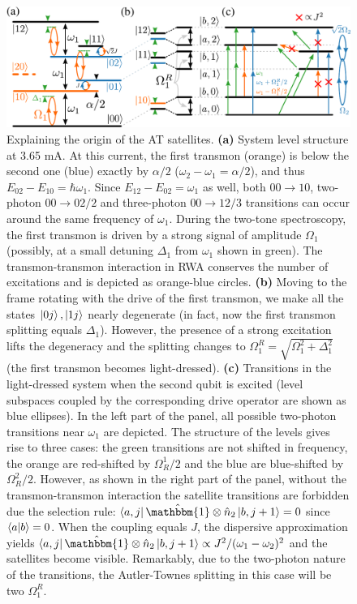 \documentclass[%
 aip,
 amsmath,amssymb,
 reprint,%
]{revtex4-1}
\begin{document}
\begin{figure}
	\centering
	\includegraphics[width=.9\linewidth]{main_scheme}
	\caption{Explaining the origin of the AT satellites. \textbf{(a)} System level structure at 3.65 mA. At this current, the first transmon (orange) is below the second one (blue) exactly by $\alpha/2$ ($\omega_2 - \omega_1 = \alpha/2$), and thus $E_{02} - E_{10} = \hbar\omega_1$. Since $E_{12} - E_{02} = \omega_1$ as well, both $00\rightarrow 10$, two-photon $00 \rightarrow 02/2$ and three-photon $00\rightarrow 12/3$ transitions can occur around the same frequency of $\omega_1$. During the two-tone spectroscopy, the first transmon is driven by a strong signal of amplitude $\Omega_1$ (possibly, at a small detuning $\Delta_1$ from $\omega_1$ shown in green). The transmon-transmon interaction in RWA conserves the number of excitations and is depicted as orange-blue circles. \textbf{(b)} Moving to the frame rotating with the drive of the first transmon, we make all the states $\ket{0j},\ket{1j}$ nearly degenerate (in fact, now the first transmon splitting equals $\Delta_1$). However, the presence of a strong excitation lifts the degeneracy and the splitting changes to $\Omega_1^R = \sqrt{\Omega_1^2 + \Delta_1^2}$ (the first transmon becomes light-dressed). \textbf{(c)} Transitions in the light-dressed system when the second qubit is excited (level subspaces coupled by the corresponding drive operator are shown as blue ellipses). In the left part of the panel, all possible two-photon transitions near $\omega_1$ are depicted. The structure of the levels gives rise to three cases: the green transitions are not shifted in frequency, the orange are red-shifted by $\Omega_R^1/2$ and the blue are blue-shifted by $\Omega_R^2/2$. However, as shown in the right part of the panel, without the transmon-transmon interaction the satellite transitions are forbidden due the selection rule: $\bra{a,j}\hat{\mathbbm{1}}\otimes \hat n_2 \ket{b, j+1} = 0$ since $\braket{a}{b} = 0$. When the coupling equals $J$, the dispersive approximation yields $\bra{a,j}\hat{\mathbbm{1}}\otimes \hat n_2\ket{b, j+1}\propto J^2/(\omega_1-\omega_2)^2$ and the satellites become visible. Remarkably, due to the two-photon nature of the transitions, the Autler-Townes splitting in this case will be two $\Omega_1^R$.}
\end{figure}
\end{document}
